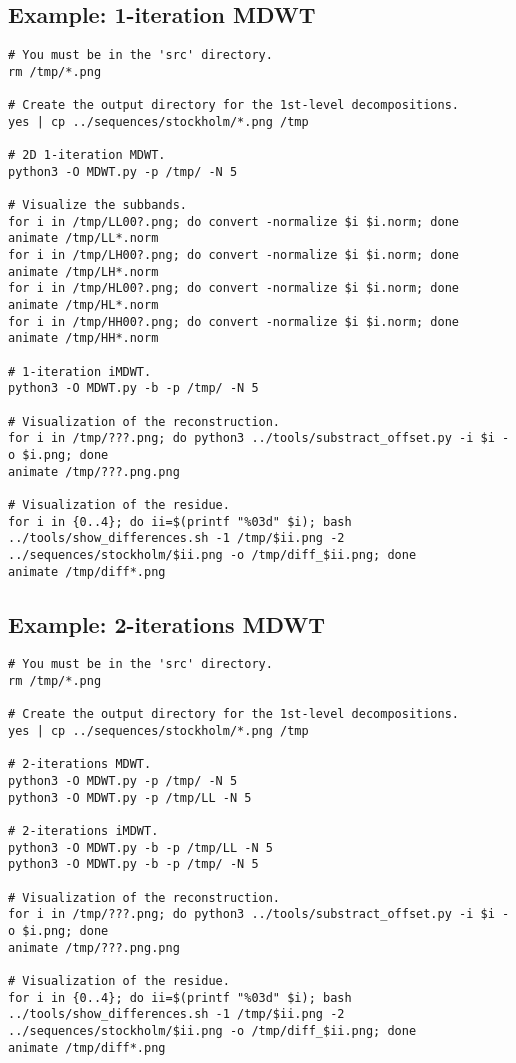 \subsection*{Example: 1-iteration MDWT}
\begin{verbatim}
# You must be in the 'src' directory.
rm /tmp/*.png

# Create the output directory for the 1st-level decompositions.
yes | cp ../sequences/stockholm/*.png /tmp

# 2D 1-iteration MDWT.
python3 -O MDWT.py -p /tmp/ -N 5

# Visualize the subbands.
for i in /tmp/LL00?.png; do convert -normalize $i $i.norm; done
animate /tmp/LL*.norm
for i in /tmp/LH00?.png; do convert -normalize $i $i.norm; done
animate /tmp/LH*.norm
for i in /tmp/HL00?.png; do convert -normalize $i $i.norm; done
animate /tmp/HL*.norm
for i in /tmp/HH00?.png; do convert -normalize $i $i.norm; done
animate /tmp/HH*.norm

# 1-iteration iMDWT.
python3 -O MDWT.py -b -p /tmp/ -N 5

# Visualization of the reconstruction.
for i in /tmp/???.png; do python3 ../tools/substract_offset.py -i $i -o $i.png; done
animate /tmp/???.png.png

# Visualization of the residue.
for i in {0..4}; do ii=$(printf "%03d" $i); bash ../tools/show_differences.sh -1 /tmp/$ii.png -2 ../sequences/stockholm/$ii.png -o /tmp/diff_$ii.png; done
animate /tmp/diff*.png
\end{verbatim}

\subsection*{Example: 2-iterations MDWT}
\begin{verbatim}
# You must be in the 'src' directory.
rm /tmp/*.png

# Create the output directory for the 1st-level decompositions.
yes | cp ../sequences/stockholm/*.png /tmp

# 2-iterations MDWT.
python3 -O MDWT.py -p /tmp/ -N 5
python3 -O MDWT.py -p /tmp/LL -N 5

# 2-iterations iMDWT.
python3 -O MDWT.py -b -p /tmp/LL -N 5
python3 -O MDWT.py -b -p /tmp/ -N 5

# Visualization of the reconstruction.
for i in /tmp/???.png; do python3 ../tools/substract_offset.py -i $i -o $i.png; done
animate /tmp/???.png.png

# Visualization of the residue.
for i in {0..4}; do ii=$(printf "%03d" $i); bash ../tools/show_differences.sh -1 /tmp/$ii.png -2 ../sequences/stockholm/$ii.png -o /tmp/diff_$ii.png; done
animate /tmp/diff*.png
\end{verbatim}

